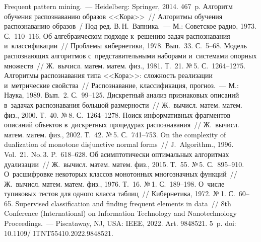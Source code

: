 \begin{multicols}{2}
{\small\frenchspacing
 {%
 \begin{thebibliography}{99}
   Frequent pattern mining.~--- Heidelberg:  Springer, 2014. 467~p.
   Алгоритм обучения распознаванию образов <<Кора>>~// 
Алгоритмы обучения распознаванию образов~/ Под ред. В.\,Н.~Вапника.~--- М.: Советское 
радио, 1973. С.~110--116.
   Об алгебраическом подходе к~решению задач распознавания 
и~классификации~// Проб\-ле\-мы кибернетики, 1978. Вып.~33. С.~5--68.
   Модель распознающих алгоритмов 
с~представительными наборами и~сис\-те\-ма\-ми опорных множеств~// Ж.~вычисл. матем. 
матем. физ., 1981. Т.~21. №\,5. С.~1264--1275.
   Алгоритмы распознавания типа <<Кора>>: сложность реализации 
  и~метрические свойства~// Распознавание, классификация, прогноз.~--- М.: Наука, 1989. Вып.~2. С.~99--125.
   Дискретный анализ признаковых описаний 
в~задачах распознавания большой раз\-мер\-ности~// Ж.~вычисл. матем. матем. физ., 2000. 
Т.~40. №\,8. С.~1264--1278.
   Поиск информативных фрагментов описаний объектов 
в~дискретных процедурах распознавания~// Ж.~вычисл. матем. матем. физ., 2002. Т.~42. 
№\,5. С.~741--753.
   On the complexity of dualization of monotone disjunctive 
normal forms~// J.~Algorithm., 1996. Vol.~21. No.\,3. P.~618--628.
   Об асимптотически оптимальных алгоритмах 
дуализации~// Ж.~вычисл. матем. матем. физ., 2015. Т.~55. №\,5. С.~895--910.
   О~расшифровке некоторых классов монотонных многозначных 
функций~// Ж.~вычисл. матем. матем. физ., 1976. Т.~16. №\,1. С.~189--198.
   О~чис\-ле тупиковых тестов для одного класса  
таб\-лиц~// Кибернетика, 1972. №\,1. С.~60--65.
   Supervised classification and finding frequent 
elements in data~// 8th Conference (International) on Information Technology and 
Nanotechnology Proceedings.~--- Piscataway, NJ, USA: IEEE, 2022. Art. 9848521. 5~p. doi: 
10.1109/ \mbox{ITNT55410}.2022.9848521.

\end{thebibliography}

 }
 }

\end{multicols}


